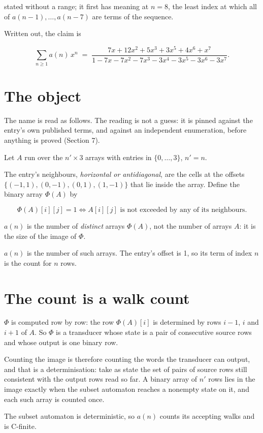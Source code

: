 \documentclass[11pt]{article}
\theoremstyle{definition}
\begin{document}
stated without a range; it first has meaning at $n = 8$, the least index at which all of $a(n-1),\dots,a(n-7)$ are terms of the sequence.

Written out, the claim is

\[\sum_{n \ge 1} a(n)\,x^n \;=\; \frac{7x + 12x^{2} + 5x^{3} + 3x^{5} + 4x^{6} + x^{7}}{1 - 7x - 7x^{2} - 7x^{3} - 3x^{4} - 3x^{5} - 3x^{6} - 3x^{7}}.\]

\section{The object}

The name is read as follows. The reading is not a guess: it is pinned against the entry's own published terms, and against an independent enumeration, before anything is proved (Section 7).

Let $A$ run over the $n' \times 3$ arrays with entries in $\{0,\dots,3\}$, $n' = n$.

The entry's neighbours, {\itshape horizontal or antidiagonal}, are the cells at the offsets $\{(-1,1), (0,-1), (0,1), (1,-1)\}$ that lie inside the array. Define the binary array $\Phi(A)$ by

\[\Phi(A)[i][j] = 1 \iff A[i][j] \text{ is not exceeded by any of its neighbours}.\]

$a(n)$ is the number of {\itshape distinct} arrays $\Phi(A)$, not the number of arrays $A$: it is the size of the image of $\Phi$.

$a(n)$ is the number of such arrays. The entry's offset is 1, so its term of index $n$ is the count for $n$ rows.

\section{The count is a walk count}

$\Phi$ is computed row by row: the row $\Phi(A)[i]$ is determined by rows $i-1$, $i$ and $i+1$ of $A$. So $\Phi$ is a transducer whose state is a pair of consecutive source rows and whose output is one binary row.

Counting the image is therefore counting the words the transducer can output, and that is a determinisation: take as state the set of pairs of source rows still consistent with the output rows read so far. A binary array of $n'$ rows lies in the image exactly when the subset automaton reaches a nonempty state on it, and each such array is counted once.

The subset automaton is deterministic, so $a(n)$ counts its accepting walks and is C-finite.
\end{document}
